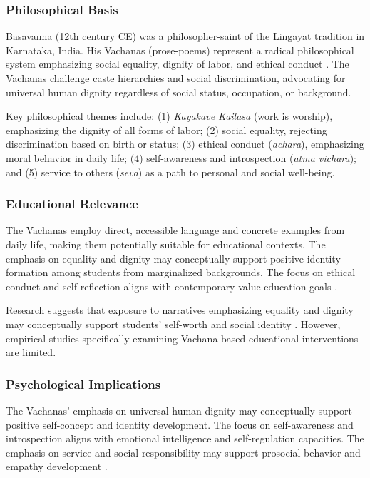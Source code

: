 \documentclass[12pt,a4paper,twocolumn]{article}
\begin{document}
\subsubsection{Philosophical Basis}

Basavanna (12th century CE) was a philosopher-saint of the Lingayat tradition in Karnataka, India. His Vachanas (prose-poems) represent a radical philosophical system emphasizing social equality, dignity of labor, and ethical conduct \citep{Hiremath1996}. The Vachanas challenge caste hierarchies and social discrimination, advocating for universal human dignity regardless of social status, occupation, or background.

Key philosophical themes include: (1) \textit{Kayakave Kailasa} (work is worship), emphasizing the dignity of all forms of labor; (2) social equality, rejecting discrimination based on birth or status; (3) ethical conduct (\textit{achara}), emphasizing moral behavior in daily life; (4) self-awareness and introspection (\textit{atma vichara}); and (5) service to others (\textit{seva}) as a path to personal and social well-being.

\subsubsection{Educational Relevance}

The Vachanas employ direct, accessible language and concrete examples from daily life, making them potentially suitable for educational contexts. The emphasis on equality and dignity may conceptually support positive identity formation among students from marginalized backgrounds. The focus on ethical conduct and self-reflection aligns with contemporary value education goals \citep{Ghosh2014}.

Research suggests that exposure to narratives emphasizing equality and dignity may conceptually support students' self-worth and social identity \citep{Singh2021}. However, empirical studies specifically examining Vachana-based educational interventions are limited.

\subsubsection{Psychological Implications}

The Vachanas' emphasis on universal human dignity may conceptually support positive self-concept and identity development. The focus on self-awareness and introspection aligns with emotional intelligence and self-regulation capacities. The emphasis on service and social responsibility may support prosocial behavior and empathy development \citep{Desai2020}.
\end{document}
